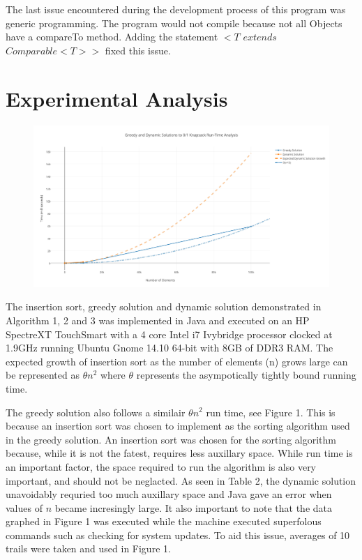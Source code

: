 \documentclass[onecolumn, 12pt, article]{IEEEtran}
\numberwithin{case}{problem}
\numberwithin{condition}{problem}
\numberwithin{condition}{subsection}
\numberwithin{definition}{section}
\theoremstyle{remark}
\numberwithin{question}{problem}
\theoremstyle{plain}
\numberwithin{answer}{problem}
\numberwithin{solution}{section}
\numberwithin{equation}{section}%
\begin{document}
The last issue encountered during the development process of this program was generic programming. The program would not compile because not all Objects have a compareTo method. Adding the statement $<T$ $extends$ $Comparable<T>>$ fixed this issue. \cite{erik}


\section{Experimental Analysis}
\begin{figure}[!]
\begin{center}
\includegraphics[scale=.55]{test-results.pdf}
\end{center}
\label{fig:runtime}
\end{figure}
The insertion sort, greedy solution and dynamic solution demonstrated in Algorithm 1, 2 and 3 was implemented in Java and executed on an HP SpectreXT TouchSmart with a 4 core Intel i7 Ivybridge processor clocked at 1.9GHz running Ubuntu Gnome 14.10 64-bit with 8GB of DDR3 RAM.
The expected growth of insertion sort as the number of elements (n) grows large can be represented as $ \theta{n^2} $ where $ \theta{} $ represents the asympotically tightly bound running time. \cite{textbook}

The greedy solution also follows a similair $ \theta{n^2} $ run time, see Figure 1. This is because an insertion sort was chosen to implement as the sorting algorithm used in the greedy solution. An insertion sort was chosen for the sorting algorithm because, while it is not the fatest, requires less auxillary space. While run time is an important factor, the space required to run the algorithm is also very important, and should not be neglacted. As seen in Table 2, the dynamic solution unavoidably requried too much auxillary space and Java gave an error when values of $n$ became incresingly large. It also important to note that the data graphed in Figure 1 was executed while the machine executed superfolous commands such as checking for system updates. To aid this issue, averages of 10 trails were taken and used in Figure 1.
\end{document}
